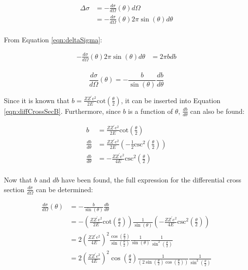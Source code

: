 \documentclass[a4paper]{article}
\begin{document}
\begin{align*}
  \Delta \sigma &=- \frac{d\sigma}{d\Omega} (\theta) d\Omega \\
                &= - \frac{d\sigma}{d\Omega} (\theta) 2 \pi
                  \sin{(\theta)} d\theta \\
\end{align*}

From Equation \ref{eqn:deltaSigma}:

\begin{align*}
  - \frac{d\sigma}{d\Omega} (\theta) 2 \pi \sin{(\theta)} d\theta &= 2 \pi b db
  \\
\end{align*}

\begin{equation}
  \frac{d\sigma}{d\Omega} (\theta) =
  - \frac{b}{\sin{(\theta)}} \frac{db}{d\theta}
\end{equation}
\label{eqn:diffCrossSecB}

Since it is known that \( b = \frac{Z Z^{\prime} e^2}{2 E}
\text{cot} \left( \frac{\theta}{2} \right) \), it can be inserted into Equation
\ref{eqn:diffCrossSecB}. Furthermore, since \( b \) is a function of \( \theta
\), \( \frac{db}{d\theta} \) can also be found:

\begin{align*}
  b &= \frac{Z Z^{\prime} e^2}{2 E} \text{cot} \left( \frac{\theta}{2} \right)
  \\
  \frac{db}{d\theta} &= \frac{Z Z^{\prime} e^2}{2 E}
                       \left( - \frac{1}{2} \text{csc}^2 \left( \frac{\theta}{2}
                       \right) \right) \\
  \frac{db}{d\theta} &= - \frac{Z Z^{\prime} e^2}{4 E} \text{csc}^2 \left(
                       \frac{\theta}{2} \right) \\
\end{align*}

\qq Now that \( b \) and \( db \) have been found, the full expression for the
differential cross section \( \frac{d\sigma}{d\Omega} \) can be determined:

\begin{align*}
  \frac{d\sigma}{d\Omega} (\theta)
  &= - \frac{b}{\sin{(\theta)}} \frac{db}{d\theta} \\
  &= - \left( \frac{Z Z^{\prime} e^2}{2 E} \text{cot} \left( \frac{\theta}{2}
    \right) \right)
    \frac{1}{\sin{(\theta)}}
    \left( - \frac{Z Z^{\prime} e^2}{4 E} \text{csc}^2 \left( \frac{\theta}{2}
    \right) \right) \\
  &= 2 \left( \frac{Z Z^{\prime} e^2}{4 E} \right)^2
    \frac{\cos{\left( \frac{\theta}{2} \right)}}{\sin{\left(
    \frac{\theta}{2} \right)}}
    \frac{1}{\sin{(\theta)}}
    \frac{1}{\sin^2 \left( \frac{\theta}{2} \right)} \\
  &= 2 \left( \frac{Z Z^{\prime} e^2}{4 E} \right)^2
    \cos{\left( \frac{\theta}{2} \right)}
    \frac{1}{\left( 2 \sin{\left( \frac{\theta}{2} \right)} \cos{\left(
    \frac{\theta}{2} \right)} \right)}
    \frac{1}{\sin^3 \left( \frac{\theta}{2} \right)} \\
\end{align*}
\end{document}

